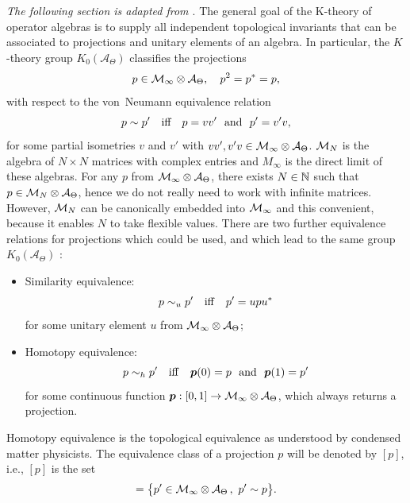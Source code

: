 \documentclass[
    10pt,
    aps,
    prb,
	longbibliography,
    twocolumn,
    floatfix,
    superscriptaddress,
]{revtex4-2}
\begin{document}
{\it The following section is adapted from \cite{Liu2022}}. The general goal of the K-theory of operator algebras is to supply all independent topological invariants that can be associated to projections and unitary elements of an algebra.
In particular, the $K$-theory group $K_0(\mathcal{A}_\Theta)$ classifies the projections
\begin{equation}
p \in {\mathcal M}_\infty \otimes {\mathcal A}_\Theta, \quad p^2 = p^\ast=p,
\end{equation}
with respect to the von~Neumann equivalence relation
\begin{equation}\label{Eq-EquivRelation}
p \sim p' \quad \mbox{iff}  \quad p=vv' \ \  {\rm and} \ \ p' = v'v, 
\end{equation}
for some partial isometries $v$ and $v'$ with  $ vv', v'v \in {\mathcal M}_\infty \otimes {\mathcal A}_\Theta$. 
${\mathcal M}_N$ is the algebra of $N \times N$ matrices with complex entries and $M_\infty$ is the direct limit of these algebras. 
For any $p$ from ${\mathcal M}_\infty \otimes {\mathcal A}_\Theta$, there exists $N \in {\mathbb N}$ such that $p \in {\mathcal M}_N \otimes {\mathcal A}_\Theta$, hence we do not really need to work with infinite matrices. However, ${\mathcal M}_N$ can be canonically embedded into ${\mathcal M}_\infty$ and this convenient, because it enables $N$ to take flexible values.
There are two further equivalence relations for projections which could be used, and which lead to the same group $K_0(\mathcal{A}_\Theta)$ \cite[p.~18]{Park2008}:
\begin{itemize}
\item  Similarity equivalence:
\begin{equation}
p \sim_u p' \quad {\rm iff} \quad p'= u p u^\ast
\end{equation}
for some unitary element $u$ from ${\mathcal M}_\infty \otimes {\mathcal A}_\Theta$;
\item Homotopy equivalence:
\begin{equation}
p \sim_h p' \quad  {\rm iff} \quad \bm p(0)=p \ \  {\rm and} \ \  \bm p(1) = p'
\end{equation}
for some continuous function $\bm p : [0,1] \rightarrow {\mathcal M}_\infty \otimes {\mathcal A}_\Theta$, which always returns a projection. 
\end{itemize}
Homotopy equivalence is the topological equivalence as understood by condensed matter physicists. 
The equivalence class of a projection $p$ will be denoted by $[p]$, i.e., $[p]$ is the set
\begin{equation}
[p]= \big \{p' \in \Mm_\infty \otimes \Aa_\Theta \, ,  \ p' \sim p \big \}.
\end{equation}
\end{document}
